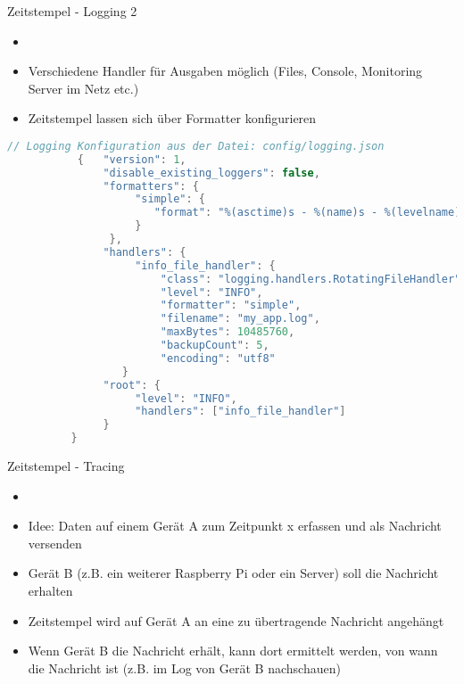 \begin{frame}[fragile]{Zeitstempel - Logging 2}
    \begin{itemize}
        \setlength{\itemindent}{1.4in}
        \item [\textbf{Konfiguration der Logger}]
    \end{itemize}

    \begin{itemize}
         \item Verschiedene Handler für Ausgaben möglich (Files, Console, Monitoring Server im Netz etc.)
         \item Zeitstempel lassen sich über Formatter konfigurieren
     \end{itemize}
     
    \begin{lstlisting}[language=Java, gobble=8]
         // Logging Konfiguration aus der Datei: config/logging.json
           {   "version": 1,
               "disable_existing_loggers": false,
               "formatters": {
                    "simple": {
                       "format": "%(asctime)s - %(name)s - %(levelname)s - %(message)s"
                    }
                },
               "handlers": {
                    "info_file_handler": {
                        "class": "logging.handlers.RotatingFileHandler",
                        "level": "INFO",
                        "formatter": "simple",
                        "filename": "my_app.log",
                        "maxBytes": 10485760,
                        "backupCount": 5,
                        "encoding": "utf8"
                  }
               "root": {
                    "level": "INFO",
                    "handlers": ["info_file_handler"]
               }
          }
        \end{lstlisting}
\end{frame}


\begin{frame}[fragile]{Zeitstempel - Tracing}
    \begin{itemize}
        \setlength{\itemindent}{1.4in}
        \item [\textbf{Tracing von Nachrichten}]
    \end{itemize}

    \begin{itemize}
              \item Idee: Daten auf einem Gerät A zum Zeitpunkt x erfassen und als Nachricht versenden
               \item Gerät B (z.B. ein weiterer Raspberry Pi oder ein Server) soll die Nachricht erhalten
               \item Zeitstempel wird auf Gerät A an eine zu übertragende Nachricht angehängt
               \item Wenn Gerät B die Nachricht erhält, kann dort ermittelt werden, von wann die Nachricht ist (z.B. im Log von Gerät B nachschauen)
     \end{itemize}

\end{frame}


